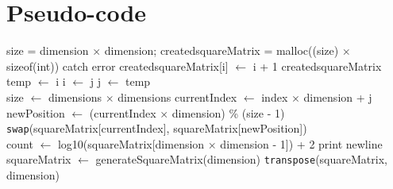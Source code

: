 \documentclass[10pt,twocolumn]{witseiepaper}
\begin{document}




\newpage
\onecolumn
{}
\setcounter{page}{1}
\begin{appendix} \label{sec:appendix}
	
\section{Pseudo-code}

\begin{algorithm}[htbp]
	\begin{algorithmic}
		
		\State size = dimension $\times$ dimension;
		\State created\textunderscore squareMatrix = malloc((size) $\times$ sizeof(int))
		\State catch error
		\EndIf
		\State created\textunderscore squareMatrix[i] $\leftarrow$ i + 1
		\EndFor
		\State \Return created\textunderscore squareMatrix
		\EndFunction \\
		
		\State temp $\leftarrow$ i
		\State i $\leftarrow$ j
		\State j $\leftarrow$ temp
		\EndFunction \\
		
		\State size $\leftarrow$ dimensions $\times$ dimensions
		\State currentIndex $\leftarrow$ index $\times$ dimension + j
		\State newPosition $\leftarrow$ (currentIndex $\times$ dimension) \% (size - 1)
		\EndFor
		\EndFor
		\State \verb|swap|(squareMatrix[currentIndex], squareMatrix[newPosition])
		\EndFunction \\
		
		\State count $\leftarrow$ log10(squareMatrix[dimension $\times$ dimension - 1]) + 2
		\State print newline
		\EndIf
		\EndFor
		\EndFunction \\
		
		\State squareMatrix $\leftarrow$ generateSquareMatrix(dimension)
		\State \verb|transpose|(squareMatrix, dimension)
		\EndFunction \\
		

\end{algorithmic}
\end{algorithm}
\end{appendix}
\end{document}
